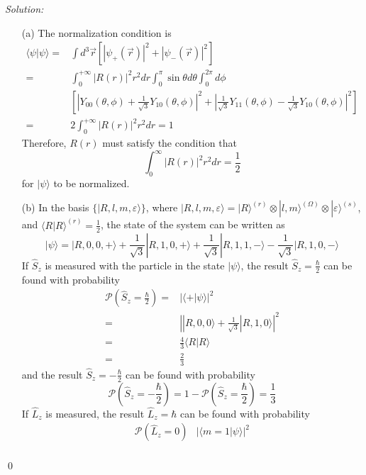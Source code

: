 \documentclass[10pt,a4paper]{article}
\newenvironment{sol}
    {\emph{Solution:}
    }
    {
    \qed
    }
\begin{document}
\begin{sol}
\begin{itemize}
\item[(a)] The normalization condition is
\begin{align}
\nonumber\langle\psi|\psi\rangle=&\int d^3\vec{r}[|\psi_+(\vec{r})|^2+|\psi_-(\vec{r})|^2]\\
\nonumber=&\int_0^{+\infty}|R(r)|^2r^2dr\int_0^{\pi}\sin\theta d\theta\int_0^{2\pi}d\phi\\
\nonumber&\left[\left|Y_{00}(\theta,\phi)+\frac{1}{\sqrt{3}}Y_{10}(\theta,\phi)\right|^2+\left|\frac{1}{\sqrt{3}}Y_{11}(\theta,\phi)-\frac{1}{\sqrt{3}}Y_{10}(\theta,\phi)\right|^2\right]\\
=&2\int_0^{+\infty}|R(r)|^2r^2dr=1
\end{align}
Therefore, $R(r)$ must satisfy the condition that
\begin{equation}
\int_0^{\infty}|R(r)|^2r^2dr=\frac{1}{2}
\end{equation}
for $|\psi\rangle$ to be normalized.
\item[(b)] In the basis $\{|R,l,m,\varepsilon\rangle\}$, where $|R,l,m,\varepsilon\rangle=|R\rangle^{(r)}\otimes|l,m\rangle^{(\Omega)}\otimes|\varepsilon\rangle^{(s)}$, and $\langle R|R\rangle^{(r)}=\frac{1}{2}$, the state of the system can be written as
\begin{equation}
|\psi\rangle=|R,0,0,+\rangle+\frac{1}{\sqrt{3}}|R,1,0,+\rangle+\frac{1}{\sqrt{3}}|R,1,1,-\rangle-\frac{1}{\sqrt{3}}|R,1,0,-\rangle
\end{equation}
If $\hat{S}_z$ is measured with the particle in the state $|\psi\rangle$, the result $\hat{S}_z=\frac{\hbar}{2}$ can be found with probability
\begin{align}
\nonumber\mathscr{P}(\hat{S}_z=\frac{\hbar}{2})=&|\langle+|\psi\rangle|^2\\
\nonumber=&\left||R,0,0\rangle+\frac{1}{\sqrt{3}}|R,1,0\rangle\right|^2\\
\nonumber=&\frac{4}{3}\langle R|R\rangle\\
=&\frac{2}{3}
\end{align}
and the result $\hat{S}_z=-\frac{\hbar}{2}$ can be found with probability
\begin{equation}
\mathscr{P}(\hat{S}_z=-\frac{\hbar}{2})=1-\mathscr{P}(\hat{S}_z=\frac{\hbar}{2})=\frac{1}{3}
\end{equation}
If $\hat{L}_z$ is measured, the result $\hat{L}_z=\hbar$ can be found with probability
\begin{align}
\nonumber\mathscr{P}(\hat{L}_z=0)&|\langle m=1|\psi\rangle|^2\\

\end{align}
\end{itemize}
\end{sol}
\end{document}
